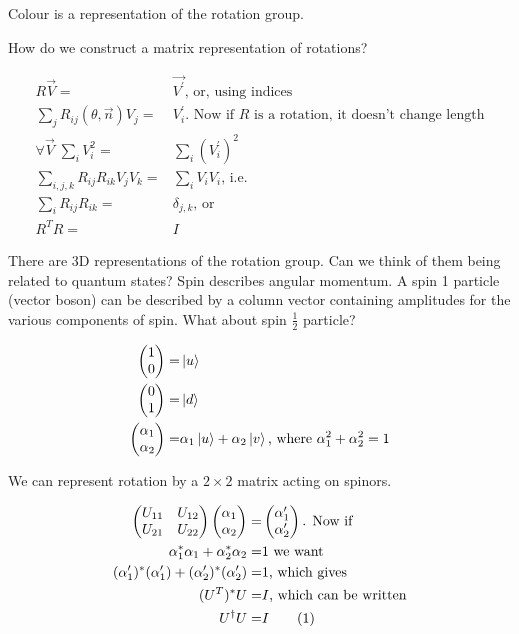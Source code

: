 \documentclass[]{article}
\newcommand\numberthis{\addtocounter{equation}{1}\tag{\theequation}}
\begin{document}
Colour is a representation of the rotation group.

How do we construct a matrix representation of rotations? 

\begin{align*}
	R \vec{V} =&\vec{V^\prime} \text{, or, using indices}\\
	\sum_j R_{ij}(\theta,\vec{n})V_j=&V_i^\prime  \text{. Now if $R$ is a rotation, it doesn't change length}\\
	\forall \vec{V} \; \sum_i V_i^2 =& \sum_i (V_i^\prime)^2\\
	\sum_{i,j,k} R_{ij} R_{ik} V_j V_k =& \sum_i V_i V_i \text{, i.e.}\\
	\sum_{i} R_{ij} R_{ik} =& \delta_{j,k} \text{, or}\\
	R^T R =& I
\end{align*}

There are 3D representations of the rotation group. Can we think of them being related to quantum states? Spin describes angular momentum. A spin 1 particle (vector boson) can be described by a column vector containing amplitudes for the various components of spin. What about spin $\frac{1}{2}$ particle?

\begin{align*}
	\begin{pmatrix}
		1\\
		0
	\end{pmatrix}=& \ket{u}\\
	\begin{pmatrix}
		0\\
		1
	\end{pmatrix}=& \ket{d}\\
	\begin{pmatrix}
		\alpha_1\\
		\alpha_2
	\end{pmatrix}=& \alpha_1 \ket{u} + \alpha_2 \ket{v} \text{, where $\alpha_1^2+\alpha_2^2=1$}
\end{align*}

We can represent rotation by a $2\times2$ matrix acting on spinors.

\begin{align*}
	\begin{pmatrix}
		U_{11}&U_{12}\\
		U_{21}&U_{22}
	\end{pmatrix} 	\begin{pmatrix}
		\alpha_1\\
		\alpha_2
	\end{pmatrix} =& \begin{pmatrix}
		\alpha^\prime_1\\
		\alpha^\prime_2
	\end{pmatrix} \text{{. Now if}}\\
	\alpha^*_1 \alpha_1 + \alpha^*_2 \alpha_2 =& 1 \text{ we want}\\
	(\alpha^\prime_1)^* (\alpha^\prime_1) + (\alpha^\prime_2)^* (\alpha^\prime_2) =& 1 \text{, which gives}\\
	(U^T)^* U =& I \text{, which can be written} \\
	U^\dagger U =& I \numberthis \label{eq:unitary:2}
\end{align*}
\end{document}
